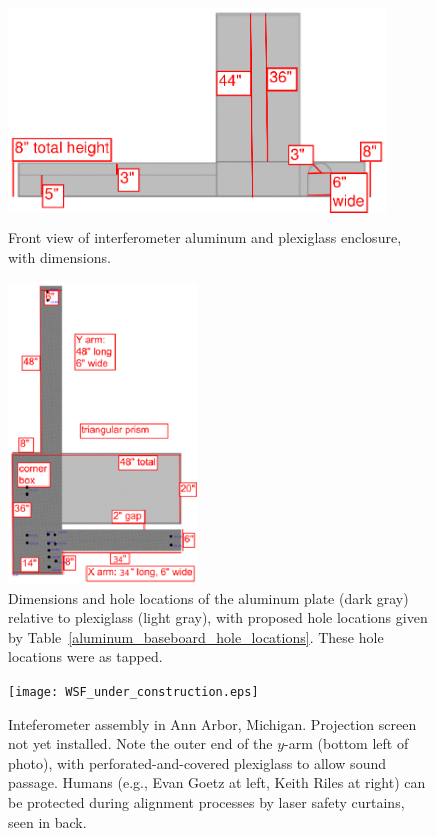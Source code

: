         \begin{figure}
        \begin{center}
        \includegraphics[height=60mm, width=100mm]{view-front.eps}
        \caption{Front view of interferometer aluminum and plexiglass enclosure, with dimensions.}
        \label{plex-view-front}
        \end{center}
        \end{figure}



        \begin{figure}
        \begin{center}
        \includegraphics[height=80mm, width=50mm]{view-top-plate-3.eps}
        \caption{Dimensions and hole locations of the aluminum plate (dark gray) relative to plexiglass (light gray), with proposed hole locations given by Table~\ref{aluminum_baseboard_hole_locations}. These hole locations were as tapped.}
        \label{al_top_plate}
        \end{center}
        \end{figure}


	\begin{figure}
	\begin{center}
	\texttt{[image: WSF\_under\_construction.eps]}
	\caption{Inteferometer assembly in Ann Arbor, Michigan. Projection screen not yet installed. Note the outer end of the $y$-arm (bottom left of photo), with perforated-and-covered plexiglass to allow sound passage. Humans (e.g., Evan Goetz at left, Keith Riles at right) can be protected during alignment processes by laser safety curtains, seen in back.}
	\label{WSF_in_AA}
	\end{center}
	\end{figure}

